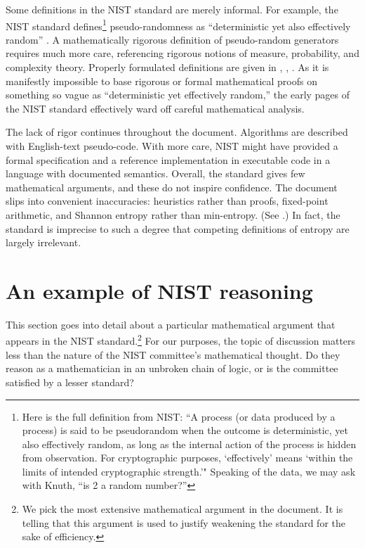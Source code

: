 \documentclass[11pt]{amsart} %
\begin{document}
Some definitions in the NIST standard are merely informal.
For example,  the NIST standard defines\footnote{Here is the full definition from NIST: 
``A process (or data produced by a process) is said to be pseudorandom when the
outcome is deterministic, yet also effectively random, as long as the internal action of the process
is hidden from observation.  For cryptographic purposes, `effectively' means `within the limits
of intended cryptographic strength.'"  Speaking of the data, we may ask with Knuth,  ``is 2 a random number?'' } 
pseudo-randomness as ``deterministic yet also effectively random'' \cite[page 7]{NIST}.
A mathematically rigorous definition of pseudo-random generators
requires much more care, referencing rigorous notions of measure, probability,
and complexity theory.  Properly formulated definitions are given in \cite{Luby1996}, \cite{Yao82}, \cite{BM84}.
As it is manifestly impossible to base rigorous or formal mathematical proofs
on something so vague as ``deterministic yet effectively random,'' the early pages of the NIST standard 
effectively ward off careful mathematical analysis.

The lack of rigor continues throughout the document.  Algorithms are described with English-text
pseudo-code.  With more care,  NIST might
have provided a formal specification and a reference implementation in executable code in a language
with documented semantics.
Overall, the standard gives few mathematical arguments,
and these do not inspire confidence.   The document 
slips into convenient inaccuracies:  
heuristics rather than proofs,  fixed-point arithmetic, 
and Shannon entropy rather than min-entropy.  (See \cite[Appendix C.2]{NIST}.)
In fact, the standard is imprecise to such a degree that competing definitions of entropy are largely irrelevant.

\section{An example of NIST reasoning}

This section goes into detail about a particular mathematical argument that appears in the
NIST standard.\footnote{We pick the most extensive mathematical argument in the document.  It is telling
that this argument is used to justify weakening the standard for the sake of efficiency.} 
For our purposes, the topic of discussion matters less than the nature of the NIST committee's mathematical
thought.  Do they reason as a mathematician in an unbroken chain of logic, or is the committee
satisfied by a lesser standard? 
\end{document}
